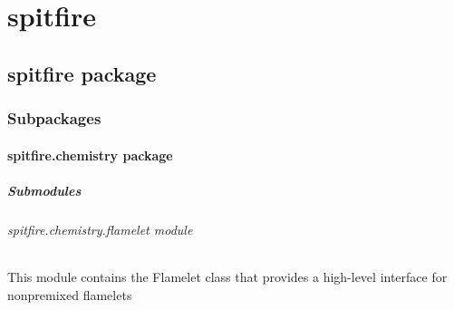 \documentclass[letterpaper,10pt,english]{sphinxmanual}
\begin{document}
\chapter{spitfire}
\label{\detokenize{modules:spitfire}}\label{\detokenize{modules::doc}}

\section{spitfire package}
\label{\detokenize{spitfire:spitfire-package}}\label{\detokenize{spitfire::doc}}

\subsection{Subpackages}
\label{\detokenize{spitfire:subpackages}}

\subsubsection{spitfire.chemistry package}
\label{\detokenize{spitfire.chemistry:spitfire-chemistry-package}}\label{\detokenize{spitfire.chemistry::doc}}

\paragraph{Submodules}
\label{\detokenize{spitfire.chemistry:submodules}}

\subparagraph{spitfire.chemistry.flamelet module}
\label{\detokenize{spitfire.chemistry.flamelet:module-spitfire.chemistry.flamelet}}\label{\detokenize{spitfire.chemistry.flamelet:spitfire-chemistry-flamelet-module}}\label{\detokenize{spitfire.chemistry.flamelet::doc}}
This module contains the Flamelet class that provides a high-level interface for nonpremixed flamelets
\end{document}
